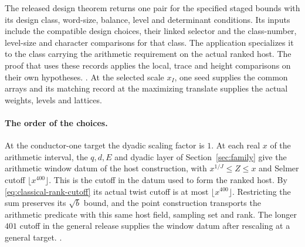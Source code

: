 The released design theorem returns one pair for the specified staged
bounds with its design class, word-size, balance, level and determinant
conditions. Its inputs include the compatible design choices, their
linked selector and the class-number, level-size and character
comparisons for that class. The application specializes it to the
class carrying the arithmetic requirement on the actual ranked host.
The proof that uses these records applies the local, trace and height
comparisons on their own hypotheses.
.
{At the selected scale \(x_I\), one seed supplies the common arrays
and its matching record at the maximizing translate supplies the
actual weights, levels and lattices.}

\paragraph{The order of the choices.}
%
At the conductor-one target the dyadic scaling factor is \(1\).
At each real \(x\) of the arithmetic interval, the \(q,d,E\) and
dyadic layer of Section~\ref{sec:family} give the arithmetic window
datum of the host construction, with
\(x^{1/J}\le Z\le x\) and Selmer cutoff \(\lfloor x^{400}\rfloor\).
This is the cutoff in the datum used to form the ranked host.
By \eqref{eq:classical-rank-cutoff} its actual twist cutoff is at
most \(\lfloor x^{400}\rfloor\). Restricting the sum preserves its
\(\sqrt b\) bound, and the point construction transports the
arithmetic predicate with this same host field, sampling set and
rank. The longer \(401\) cutoff in the general release supplies the
window datum after rescaling at a general target.
.

